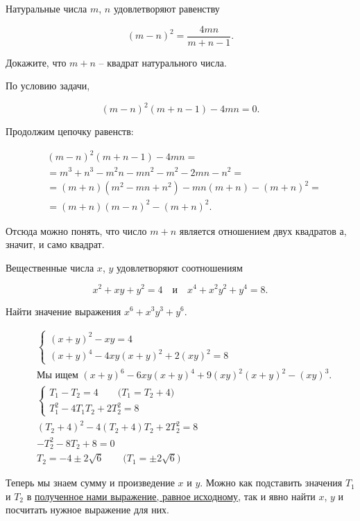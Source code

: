 ﻿


\begin{itemize}

\itB Натуральные числа $m$, $n$ удовлетворяют равенству

$$(m-n)^2=\frac{4mn}{m+n-1}.$$

Докажите, что $m+n$ -- квадрат натурального числа.

\itr По условию задачи,

$$(m-n)^2 (m+n-1) - 4mn = 0.$$

Продолжим цепочку равенств:

\begin{align*}
	& (m-n)^2 (m+n-1) - 4mn = \\
	& = m^3 + n^3 - m^2n - mn^2 - m^2 - 2mn - n^2 =\\
	& = (m+n)(m^2-mn+n^2) -mn(m+n) -(m+n)^2 = \\
	& = (m+n)(m-n)^2 -(m+n)^2.
\end{align*}

Отсюда можно понять, что число $m+n$ является отношением двух квадратов а, значит, и само квадрат.

\itC Вещественные числа $x$, $y$ удовлетворяют соотношениям

$$x^2+xy+y^2=4\quad\text{и}\quad x^4+x^2y^2+y^4=8.$$

Найти значение выражения $x^6+x^3y^3+y^6$.

\itr
\begin{align*}
& \begin{cases}
	(x+y)^2 - xy = 4 \\
	(x+y)^4 - 4xy(x+y)^2 + 2(xy)^2 = 8
\end{cases} \\
& \label{herestav} \text{Мы ищем $(x+y)^6 - 6xy(x+y)^4 + 9(xy)^2(x+y)^2 - (xy)^3$.} \\
& \begin{cases}
	T_1 - T_2 =4 \qquad \text{($T_1=T_2+4$)} \\
	T_1^2 - 4T_1T_2 + 2T_2^2 = 8
\end{cases} \\
	& (T_2+4)^2 - 4(T_2+4)T_2 + 2T_2^2 = 8 \\
	& -T_2^2 - 8 T_2 + 8 = 0 \\
	& T_2 = -4 \pm 2 \sqrt 6\qquad \text{($T_1 = \pm 2\sqrt 6$)}
\end{align*}

Теперь мы знаем сумму и произведение $x$ и $y$. Можно как подставить значения $T_1$ и $T_2$ в \hyperref[herestav]{полученное нами выражение, равное исходному}, так и явно найти $x$, $y$ и посчитать нужное выражение для них.

\end{itemize}

